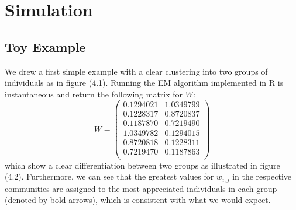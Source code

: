 \documentclass[12pt]{ociamthesis}  %
\begin{document}
	\section{Simulation}
	
	\subsection{Toy Example}
	
	We drew a first simple example with a clear clustering into two groups of individuals as in figure (4.1). Running the EM algorithm implemented in R is instantaneous and return the following matrix for $W$:
	\begin{equation}
	W = 
	\begin{pmatrix}
	0.1294021 & 1.0349799 \\
	0.1228317 & 0.8720837 \\
	0.1187870 & 0.7219490 \\
	1.0349782 & 0.1294015 \\
	0.8720818 & 0.1228311 \\
	0.7219470 & 0.1187863 \\
	\end{pmatrix}
	\end{equation} which show a clear differentiation between two groups as illustrated in figure (4.2). Furthermore, we can see that the greatest values for $w_{i,j}$ in the respective communities are assigned to the most appreciated individuals in each group (denoted by bold arrows), which is consistent with what we would expect.
	
\end{document}
